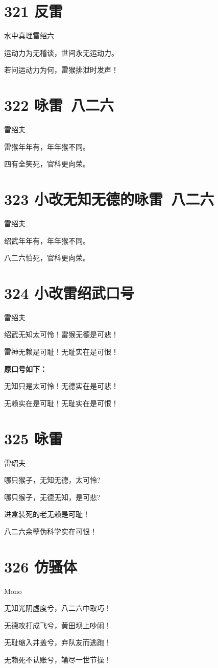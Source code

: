 \documentclass[UTF8,12pt,oneside]{ctexbook}
\def\pau#1{\begin{center} {#1} \end{center}} %
\def\poem#1#2{\section{#1}\pau{#2}} %
\begin{document}
        \poem{321 反雷}{水中真理雷绍六}
        \begin{center}
            运动力为无稽谈，世间永无运动力。
        
            若问运动力为何，雷猴排泄时发声！
        \end{center}

        \poem{322 咏雷\ 八二六}{雷绍夫}
        \begin{center}
            雷猴年年有，年年猴不同。
            
            四有全笑死，官科更向荣。
        \end{center}
        
        \poem{323 小改无知无德的咏雷\ 八二六}{雷绍夫}
        \begin{center}
            绍武年年有，年年猴不同。
            
            八二六怕死，官科更向荣。
        \end{center}
        
        \poem{324 小改雷绍武口号}{雷绍夫}
        \begin{center}
            绍武无知太可怜！雷猴无德是可悲！

            雷神无赖是可耻！无耻实在是可恨！
        \end{center}

        \noindent \textbf{原口号如下：}
        \begin{center}
            无知只是太可怜！无德实在是可悲！

            无赖实在是可耻！无耻实在是可恨！
        \end{center} 

        \poem{325 咏雷}{雷绍夫}
        \begin{center}
            哪只猴子，无知无德，太可怜?
            
            哪只猴子，无德无知，是可悲?
        
            进盒装死的老无赖是可耻！
            
            八二六余孽伪科学实在可恨！
        \end{center}

        \poem{326 仿骚体}{Mono}
        \begin{center}
            无知光阴虚度兮，八二六中取巧！

            无德攻打成飞兮，黄田坝上吵闹！

            无耻缩入井盖兮，弃队友而逃跑！

            无赖死不认账兮，输尽一世节操！
        \end{center}
\end{document}
